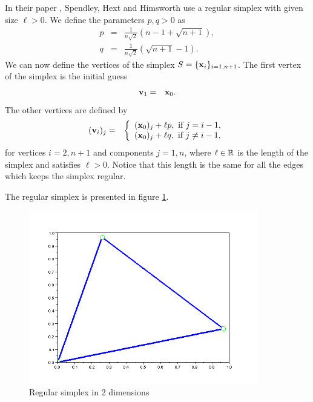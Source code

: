 In their paper \cite{Spendley1962}, Spendley, Hext and Himsworth use a regular 
simplex with given size $\ell>0$. We define the parameters $p,q>0$ as 
\begin{eqnarray}
p &=& \frac{1}{n\sqrt{2}} \left(n-1 + \sqrt{n+1}\right), \\
q &=& \frac{1}{n\sqrt{2}} \left(\sqrt{n+1} - 1\right).
\end{eqnarray}
We can now define the vertices of the simplex $S=\{\mathbf{x}_i\}_{i=1,n+1}$.
The first vertex of the simplex is the initial guess 
\begin{eqnarray}
\mathbf{v}_1 &=& \mathbf{x}_0.
\end{eqnarray}
The other vertices are defined by 
\begin{eqnarray}
(\mathbf{v}_i)_j &=& 
\left\{
\begin{array}{l}
(\mathbf{x}_0)_j + \ell p, \textrm{ if } j=i-1,\\
(\mathbf{x}_0)_j + \ell q, \textrm{ if } j\neq i-1,\\
\end{array}
\right.
\end{eqnarray}
for vertices $i=2,n+1$ and components $j=1,n$, 
where $\ell \in\mathbb{R}$ is the length of the simplex and satisfies $\ell>0$. Notice that this 
length is the same for all the edges which keeps the simplex regular.

The regular simplex is presented in figure \ref{fig-nm-simplex-regular}.

\begin{figure}
\begin{center}
\includegraphics[width=10cm]{simplex_regular.png}
\end{center}
\caption{Regular simplex in 2 dimensions}
\label{fig-nm-simplex-regular}
\end{figure}

